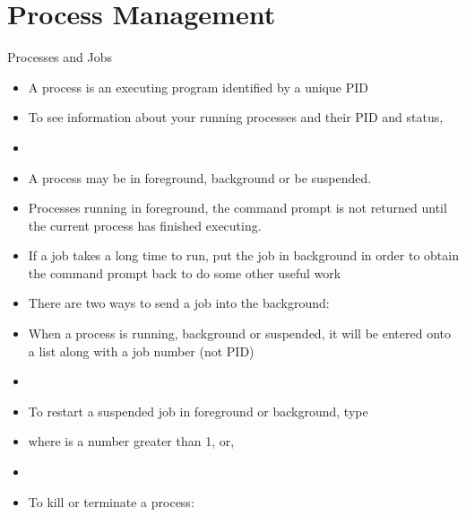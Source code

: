 \documentclass[10pt,t]{beamer}
\begin{document}
\section{Process Management}
\begin{frame}{\small Processes and Jobs}
  \begin{itemize}
    \item A process is an executing program identified by a unique PID
    \item[$\mybigstar$] To see information about your running processes and their PID and status,
    \item[] 
    \item A process may be in foreground, background or be suspended.
    \item Processes running in foreground, the command prompt is not returned until the current process has finished executing.
    \item If a job takes a long time to run, put the job in background in order to obtain the command prompt back to do some other useful work
    \item There are two ways to send a job into the background:
    \framebreak
    \item When a process is running, background or suspended, it will be entered onto a list along with a job number (not PID)
    \item[] 
    \item To restart a suspended job in foreground or background, type
    \item[]  where  is a number greater than 1, or,
    \item[]  
    \item To kill or terminate a process:

\end{itemize}
\end{frame}
\end{document}
